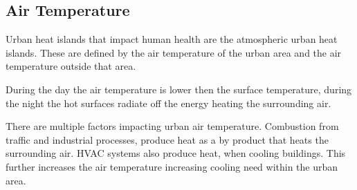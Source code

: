 \subsection{Air Temperature}
Urban heat islands that impact human health are the atmospheric urban heat islands. 
These are defined by the air temperature of the urban area and the air temperature outside that area. %

During the day the air temperature is lower then the surface temperature\cite{epa}, during the night the hot surfaces radiate off the energy heating the surrounding air. 

There are multiple factors impacting urban air temperature. 
Combustion from traffic and industrial processes, produce heat as a by product that heats the surrounding air. 
HVAC systems also produce heat, when cooling buildings. This further increases the air temperature increasing cooling need within the urban area. 


